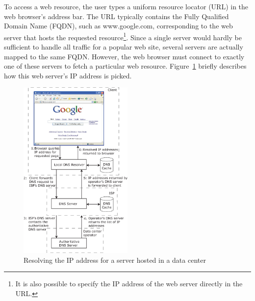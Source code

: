 To access a web resource, the user types a uniform resource locator (URL) in the web browser's address bar. The URL typically contains the Fully Qualified Domain Name (FQDN), such as www.google.com, corresponding to the web server that hosts the requested resource\footnote{It is also possible to specify the IP address of the web server directly in the URL.}. Since a single server would hardly be sufficient to handle all traffic for a popular web site, several servers are actually mapped to the same FQDN. However, the web browser must connect to exactly one of these servers to fetch a particular web resource. Figure~\ref{fig:dcloadbalance} briefly describes how this web server's IP address is picked.  

\begin{figure}
\centering
\includegraphics[width=0.5\textwidth]{pics/dcloadbalance.eps}
\caption{Resolving the IP address for a server hosted in a data center}
\label{fig:dcloadbalance}
\end{figure}

